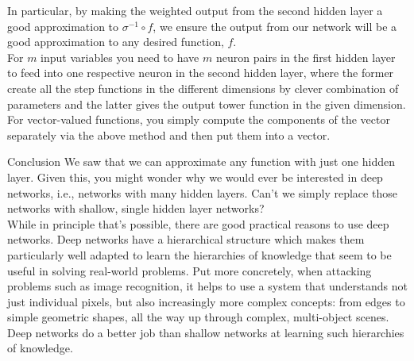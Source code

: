 In particular, by making the weighted output from the second hidden layer a good approximation to $\sigma^{-1}\circ f$, we ensure the output from our network will be a good approximation to any desired function, $f$.\\
For $m$ input variables you need to have $m$ neuron pairs in the first hidden layer to feed into one respective neuron in the second hidden layer, where the former create all the step functions in the different dimensions by clever combination of parameters and the latter gives the output tower function in the given dimension.\\
For vector-valued functions, you simply compute the components of the vector separately via the above method and then put them into a vector.
\begin{mybox}{Conclusion}
We saw that we can approximate any function with just one hidden layer. Given this, you might wonder why we would ever be interested in deep networks, i.e., networks with many hidden layers. Can't we simply replace those networks with shallow, single hidden layer networks?\\
While in principle that's possible, there are good practical reasons to use deep networks. Deep networks have a hierarchical structure which makes them particularly well adapted to learn the hierarchies of knowledge that seem to be useful in solving real-world problems. Put more concretely, when attacking problems such as image recognition, it helps to use a system that understands not just individual pixels, but also increasingly more complex concepts: from edges to simple geometric shapes, all the way up through complex, multi-object scenes. Deep networks do a better job than shallow networks at learning such hierarchies of knowledge.
\end{mybox}
